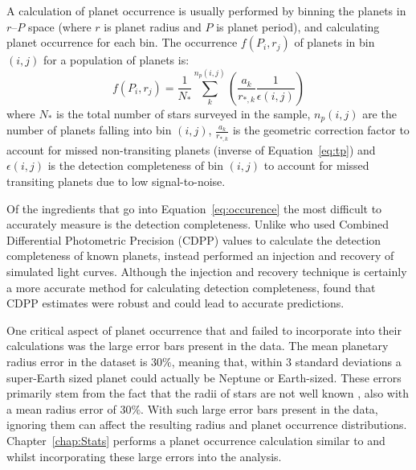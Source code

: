 A calculation of planet occurrence is usually performed by binning the planets in $r$--$P$ space (where $r$ is planet radius and $P$ is planet period), and calculating planet occurrence for each bin. 
The occurrence $f(P_i, r_j)$ of planets in bin $(i,j)$ for a population of planets is:
\begin{equation}
f(P_i, r_j) = \frac{1}{N_*} \sum_k^{n_p(i,j)} \left(\frac{a_k}{r_{*,k}} \frac{1}{\epsilon(i,j)} \right)
\label{eq:occurence}
\end{equation}
where $N_*$ is the total number of stars surveyed in the sample, $n_p(i, j)$ are the number of planets falling into bin $(i, j)$, $\frac{a_k}{r_{*,k}}$ is the geometric correction factor to account for missed non-transiting planets (inverse of Equation~\ref{eq:tp}) and $\epsilon(i,j)$ is the detection completeness of bin $(i, j)$ to account for missed transiting planets due to low signal-to-noise.

Of the ingredients that go into Equation~\ref{eq:occurence} the most difficult to accurately measure is the detection completeness. 
Unlike \citet{Fressin2013} who used Combined Differential Photometric Precision (CDPP) values to calculate the detection completeness of known planets, \citet{Petigura2013} instead performed an injection and recovery of simulated light curves. 
Although the injection and recovery technique is certainly a more accurate method for calculating detection completeness, \citet{Fressin2013} found that CDPP estimates were robust and could lead to accurate predictions. 

One critical aspect of planet occurrence that \citet{Fressin2013} and \citet{Petigura2013} failed to incorporate into their calculations was the large error bars present in the \kep data.
The mean planetary radius error in the \citep{Ramirez2014} \kep dataset is $30\%$, meaning that, within 3 standard deviations a super-Earth sized planet could actually be Neptune or Earth-sized. 
These errors primarily stem from the fact that the radii of \kep stars are not well known \citep{Brown2011}, also with a mean radius error of $30\%$.
With such large error bars present in the \kep data, ignoring them can affect the resulting radius and planet occurrence distributions.
Chapter~\ref{chap:Stats} performs a planet occurrence calculation similar to \citet{Fressin2013} and \citet{Petigura2013} whilst incorporating these large errors into the analysis. 

